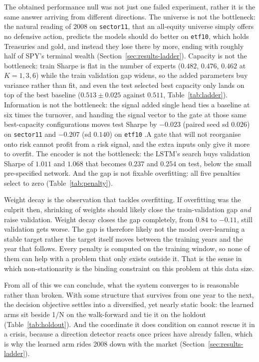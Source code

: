 The obtained performance null was not just one failed experiment, rather it is the same answer arriving from different directions. The universe is not the bottleneck: the natural reading of 2008 on \texttt{sector11}, that an all-equity universe simply offers no defensive action, predicts the models should do better on \texttt{etf10}, which holds Treasuries and gold, and instead they lose there by more, ending with roughly half of SPY's terminal wealth (Section~\ref{sec:results-ladder}). Capacity is not the bottleneck: train Sharpe is flat in the number of experts ($0.482$, $0.476$, $0.462$ at $K=1,3,6$) while the train validation gap widens, so the added parameters buy variance rather than fit, and even the test selected best capacity only lands on top of the best baseline ($0.513 \pm 0.025$ against $0.511$, Table~\ref{tab:ladder}). Information is not the bottleneck: the signal added single head ties a baseline at six times the turnover, and handing the signal vector to the gate at those same best-capacity configurations moves test Sharpe by $-0.023$ (paired seed sd $0.026$) on \texttt{sector11} and $-0.207$ (sd $0.140$) on \texttt{etf10} .A gate that will not reorganise onto risk cannot profit from a risk signal, and the extra inputs only give it more to overfit. The encoder is not the bottleneck: the LSTM's search buys validation Sharpe of $1.011$ and $1.068$ that becomes $0.237$ and $0.254$ on test, below the small pre-specified network. And the gap is not fixable overfitting: all five penalties select to zero (Table~\ref{tab:penalty}).

Weight decay is the observation that tackles overfitting. If overfitting was the culprit then, shrinking of weights should likely close the train-validation gap \emph{and} raise validation. Weight decay closes the gap completely, from $0.84$ to $-0.11$, still validation gets worse. The gap is therefore likely not the model over-learning a stable target rather the target itself moves between the training years and the year that follows. Every penalty is computed on the training window, so none of them can help with a problem that only exists outside it. That is the sense in which non-stationarity is the binding constraint on this problem at this data size.

From all of this we can conclude, what the system converges to is reasonable rather than broken. With some structure that survives from one year to the next, the decision objective settles into a diversified, yet nearly static book: the learned arms sit beside 1/N on the walk-forward and tie it on the holdout (Table~\ref{tab:holdout}). And the coordinate it does condition on cannot rescue it in a crisis, because a direction detector reacts once prices have already fallen, which is why the learned arm rides 2008 down with the market (Section~\ref{sec:results-ladder}). 


